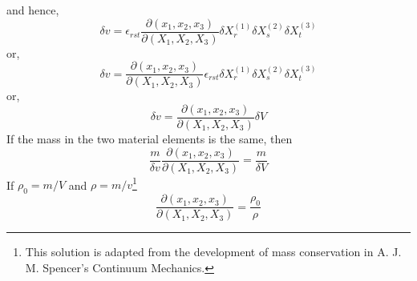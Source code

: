 \begin{enumerate}
\[\]
and hence,
\[
\delta v = \epsilon_{rst}\frac{\partial(x_1, x_2, x_3)}{\partial(X_1, X_2, X_3)}\delta X_r^{(1)}\delta X_s^{(2)}\delta X_t^{(3)}
\]
or,
\[
\delta v = \frac{\partial(x_1, x_2, x_3)}{\partial(X_1, X_2, X_3)}\epsilon_{rst}\delta X_r^{(1)}\delta X_s^{(2)}\delta X_t^{(3)}
\]
or,
\[
\delta v = \frac{\partial(x_1, x_2, x_3)}{\partial(X_1, X_2, X_3)} \delta V
\]
If the mass in the two material elements is the same, then
\[
\frac{m}{\delta v}\frac{\partial(x_1, x_2, x_3)}{\partial(X_1, X_2, X_3)} = \frac{m}{\delta V}
\]
If $\rho_0 = m/V$ and $\rho = m/v$\footnote{This solution is adapted from the development of mass conservation in A. J. M. Spencer's Continuum Mechanics\cite{spencer2004continuum}.}
\[
\frac{\partial(x_1, x_2, x_3)}{\partial(X_1, X_2, X_3)} = \frac{\rho_0}{\rho}
\]
\end{enumerate}

